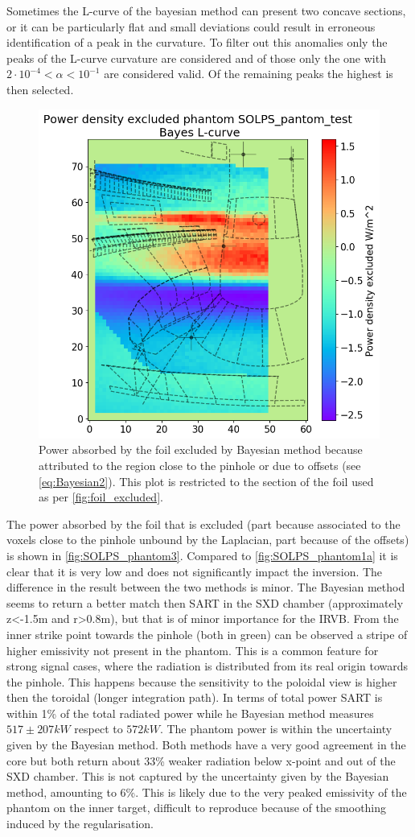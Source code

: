 Sometimes the L-curve of the bayesian method can present two concave sections, or it can be particularly flat and small deviations could result in erroneous identification of a peak in the curvature. To filter out this anomalies only the peaks of the L-curve curvature are considered and of those only the one with $2 \cdot 10^{-4} < \alpha < 10^{-1}$ are considered valid. Of the remaining peaks the highest is then selected.

\begin{figure}
	\centering
	\includegraphics[trim={0 0 0 45},clip,width=0.5\linewidth]{Chapters/chapter2/figs/inversion_comparison_foil_power_excluded_SOLPS_pantom_test-Bayes.png}
	\caption{Power absorbed by the foil excluded by Bayesian method because attributed to the region close to the pinhole or due to offsets (see \autoref{eq:Bayesian2}). This plot is restricted to the section of the foil used as per \autoref{fig:foil_excluded}.}
	\label{fig:SOLPS_phantom3}
\end{figure}

The power absorbed by the foil that is excluded (part because associated to the voxels close to the pinhole unbound by the Laplacian, part because of the offsets) is shown in \autoref{fig:SOLPS_phantom3}. Compared to \autoref{fig:SOLPS_phantom1a} it is clear that it is very low and does not significantly impact the inversion.
The difference in the result between the two methods is minor. The Bayesian method seems to return a better match then SART in the SXD chamber (approximately z<-1.5m and r>0.8m), but that is of minor importance for the IRVB. From the inner strike point towards the pinhole (both in green) can be observed a stripe of higher emissivity not present in the phantom. This is a common feature for strong signal cases, where the radiation is distributed from its real origin towards the pinhole. This happens because the sensitivity to the poloidal view is higher then the toroidal (longer integration path). In terms of total power SART is within 1\% of the total radiated power while he Bayesian method measures $517\pm207 kW$ respect to $572kW$. The phantom power is within the uncertainty given by the Bayesian method. Both methods have a very good agreement in the core but both return about 33\% weaker radiation below x-point and out of the SXD chamber. This is not captured by the uncertainty given by the Bayesian method, amounting to 6\%. This is likely due to the very peaked emissivity of the phantom on the inner target, difficult to reproduce because of the smoothing induced by the regularisation.

